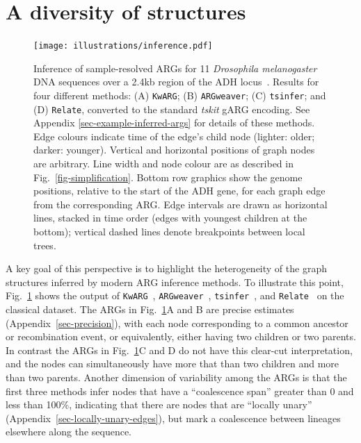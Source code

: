 \documentclass{article}
\newcommand{\tsinfer}[0]{\texttt{tsinfer}}
\newcommand{\kwarg}[0]{\texttt{KwARG}}
\newcommand{\argweaver}[0]{\texttt{ARGweaver}}
\newcommand{\relate}[0]{\texttt{Relate}}
\begin{document}
\section{A diversity of structures}
\begin{figure} \begin{center}
\texttt{[image: illustrations/inference.pdf]} \end{center}
\caption{\label{fig-inferred-args} Inference of sample-resolved ARGs for 11
\textit{Drosophila melanogaster} DNA sequences over a 2.4kb
region of the ADH locus~\citep{kreitman1983nucleotide}.
Results for four different methods:
(A) \kwarg; (B) \argweaver; (C) \tsinfer; and (D) \relate, converted 
to the standard \emph{tskit} gARG encoding. See
Appendix \ref{sec-example-inferred-args} for details of these methods.
Edge colours indicate time of the edge's child node
(lighter: older; darker: younger).
Vertical and horizontal positions of graph nodes are arbitrary.
Line width and node colour are as described in Fig.~\ref{fig-simplification}.
Bottom row graphics show the genome positions, relative to the start of
the ADH gene, for each graph edge from the corresponding ARG. Edge intervals
are drawn as horizontal lines, stacked in time order (edges with youngest
children at the bottom); vertical dashed lines denote breakpoints between
local trees.
}
\end{figure}
A key goal of this perspective is to highlight the heterogeneity of
the graph structures inferred by modern ARG inference methods.
To illustrate this point, Fig.~\ref{fig-inferred-args} shows the 
output of 
\kwarg~\citep{ignatieva2021kwarg},
\argweaver~\citep{rasmussen2014genome},
\tsinfer~\citep{kelleher2019inferring},
and \relate~\citep{speidel2019method}
on the classical \cite{kreitman1983nucleotide} dataset. 
The ARGs in Fig.~\ref{fig-inferred-args}A and B are precise 
estimates (Appendix~\ref{sec-precision}),
with each node corresponding to a common ancestor 
or recombination event, or  equivalently, either having two children
or two parents.
In contrast the ARGs in Fig.~\ref{fig-inferred-args}C and D do not 
have this clear-cut interpretation, and the nodes
can simultaneously have more that than two children and more
than two parents. Another dimension of variability among the ARGs
is that the first three methods infer nodes that have
a ``coalescence span''  greater than 0 and less than 100\%, indicating that there 
are nodes that are ``locally unary'' (Appendix~\ref{sec-locally-unary-edges}),
but mark a coalescence between lineages elsewhere along the sequence.
\end{document}

